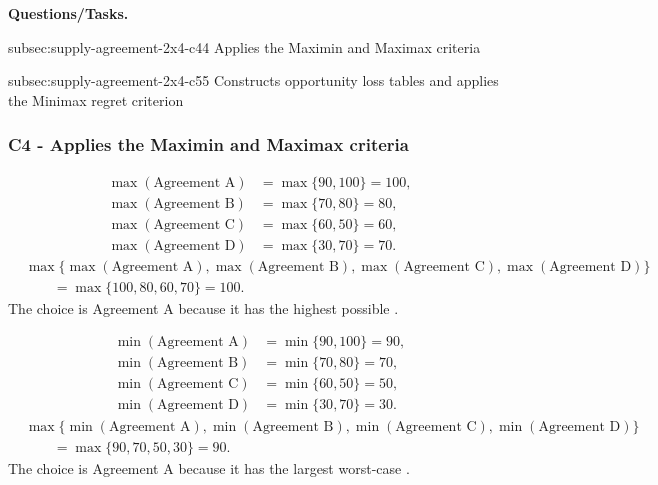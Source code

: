 	\textbf{Questions/Tasks.}
	\begin{enumerate}
		\CriterionTask
		{subsec:supply-agreement-2x4-c4}{4}
		{Applies the Maximin and Maximax criteria}

		\CriterionTask
		{subsec:supply-agreement-2x4-c5}{5}
		{Constructs opportunity loss tables and applies the Minimax regret criterion}
	\end{enumerate}
	
	\subsubsection*{C4 - Applies the Maximin and Maximax criteria}
	\label{subsec:supply-agreement-2x4-c4}
	
	\[
	\begin{aligned}
		\max(\text{Agreement A}) &= \max\{90,100\}=100,\\
		\max(\text{Agreement B}) &= \max\{70,80\}=80,\\
		\max(\text{Agreement C}) &= \max\{60,50\}=60,\\
		\max(\text{Agreement D}) &= \max\{30,70\}=70.
	\end{aligned}
	\]
	\[
	\begin{aligned}
		&\max\{\max(\text{Agreement A}),\max(\text{Agreement B}),
		\max(\text{Agreement C}),\max(\text{Agreement D})\}\\
		&\qquad=\max\{100,80,60,70\}
		=100.
	\end{aligned}
	\]
	The  choice is Agreement A because it has the highest possible .
	
	\[
	\begin{aligned}
		\min(\text{Agreement A}) &= \min\{90,100\}=90,\\
		\min(\text{Agreement B}) &= \min\{70,80\}=70,\\
		\min(\text{Agreement C}) &= \min\{60,50\}=50,\\
		\min(\text{Agreement D}) &= \min\{30,70\}=30.
	\end{aligned}
	\]
	\[
	\begin{aligned}
		&\max\{\min(\text{Agreement A}),\min(\text{Agreement B}),
		\min(\text{Agreement C}),\min(\text{Agreement D})\}\\
		&\qquad=\max\{90,70,50,30\}
		=90.
	\end{aligned}
	\]
	The  choice is Agreement A because it has the largest worst-case .
	
